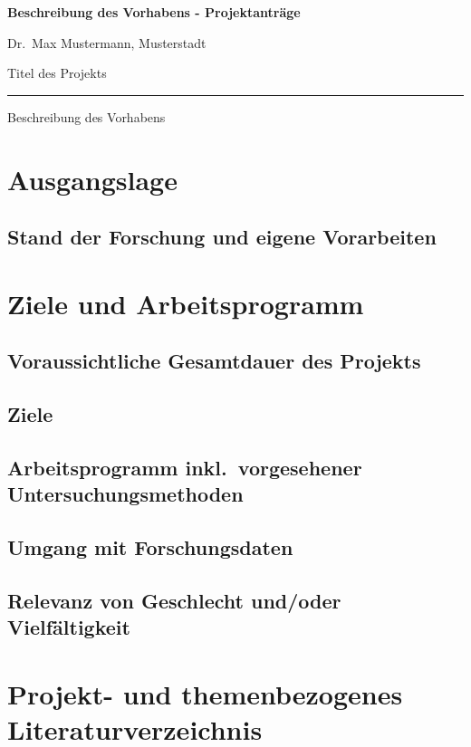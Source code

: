\documentclass{scrartcl}
\newcommand{\applicants}{Dr.\ Max Mustermann, Musterstadt}
\newcommand{\project}{Titel des Projekts}
\begin{document}
{\raggedright{} \normalsize \bfseries
	Beschreibung des Vorhabens - Projektanträge \par
    \applicants{} \par
    \project{} \par
	\rule{\textwidth}{0.5pt} \par
	Beschreibung des Vorhabens
}


\section{Ausgangslage}

\subsection*{Stand der Forschung und eigene Vorarbeiten}


\section{Ziele und Arbeitsprogramm}

\subsection{Voraussichtliche Gesamtdauer des Projekts}

\subsection{Ziele}

\subsection{Arbeitsprogramm inkl.\ vorgesehener Untersuchungsmethoden}

\subsection{Umgang mit Forschungsdaten}

\subsection{Relevanz von Geschlecht und/oder Vielfältigkeit}


\section{Projekt- und themenbezogenes Literaturverzeichnis}
\end{document}
